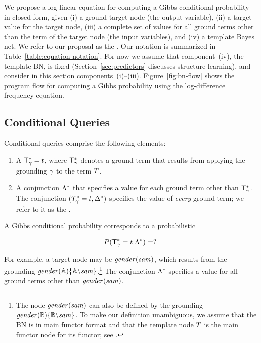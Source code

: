 \documentclass[runningheads,a4paper]{llncs}
\begin{document}
We propose a log-linear equation for computing a Gibbs conditional probability in closed form, given (i) a ground target node (the output variable), (ii) a target value for the target node, (iii) a complete set of values for all ground terms other than the term of the target node (the input variables), and (iv) a template Bayes net. We refer to our proposal as the 
. Our notation is summarized in Table~\ref{table:equation-notation}. For now we assume that component~(iv), the template BN, is fixed (Section~\ref{sec:predictors} discusses structure learning), and consider in this section components~(i)--(iii). 
Figure~\ref{fig:bn-flow} shows the program flow for computing a Gibbs probability using the log-difference frequency equation.

% 



 \subsection{Conditional Queries} Conditional queries comprise the following elements:
 
\begin{enumerate}
\item A  $\mathsf{T}_\gamma^{*}\hspace{0.0ex} = t$, where $\mathsf{T}_\gamma^{*}\hspace{0.0ex}$ denotes a ground term that results from applying the grounding $\gamma$ to the term $T$.
\item A conjunction $\Lambda^{*}\hspace{0.0ex}$ that specifies a value for each ground term other than $\mathsf{T}_\gamma^{*}\hspace{0.0ex}$. The conjunction $(T_\gamma^{*}\hspace{0.0ex} = t, \Delta^{*}\hspace{0.0ex})$ specifies the value of {\em every} ground term; we refer to it as the .
\end{enumerate}

A Gibbs conditional probability corresponds to a probabilistic 

$$P(\mathsf{T}_\gamma^{*}\hspace{0.0ex} = t | \Lambda^{*}\hspace{0.0ex}) = ?$$

\noindent For example, a target node may be $\it{gender}(sam)$, which results from the grounding $\it{gender}(\mathbb{A})\{\mathbb{A}\backslash sam\}$.\footnote{The node $\it{gender}(sam)$ can also be defined by the grounding $\it{gender}(\mathbb{B})\{\mathbb{B}\backslash sam\}$. To make our definition unambiguous, we assume that the BN is in main functor format and that the template node $T$ is the main functor node for its functor; see \cite{Schulte2012a}.}  The conjunction $\Lambda^{*}\hspace{0.0ex}$ specifies a value for all ground terms other than $\it{gender}(sam)$.
\end{document}
